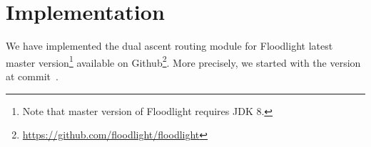 \chapter{Implementation}\label{ch:implementation}

We have implemented the dual ascent routing module for Floodlight latest master
version\footnote{Note that master version of Floodlight requires JDK 8.}
available on Github\footnote{\url{https://github.com/floodlight/floodlight}}.
More precisely, we started with the version at
commit~\href{https://github.com/floodlight/floodlight/tree/d737cb05656a6038f4e2277ffb4503d45b7b29cb}{}.
